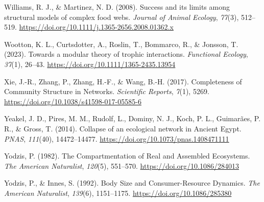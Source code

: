 \documentclass[
]{article}
\newlength{\cslhangindent}
\newenvironment{CSLReferences}[2] %
 {\begin{list}{}{%
  \setlength{\itemindent}{0pt}
  \setlength{\leftmargin}{0pt}
  \setlength{\parsep}{0pt}
  \ifodd #1
   \setlength{\leftmargin}{\cslhangindent}
   \setlength{\itemindent}{-1\cslhangindent}
  \fi
  \setlength{\itemsep}{#2\baselineskip}}}
 {\end{list}}
\begin{document}
\begin{CSLReferences}{1}{0}
Williams, R. J., \& Martinez, N. D. (2008). Success and its limits among
structural models of complex food webs. \emph{Journal of Animal
Ecology}, \emph{77}(3), 512--519.
\url{https://doi.org/10.1111/j.1365-2656.2008.01362.x}

Wootton, K. L., Curtsdotter, A., Roslin, T., Bommarco, R., \& Jonsson,
T. (2023). Towards a modular theory of trophic interactions.
\emph{Functional Ecology}, \emph{37}(1), 26--43.
\url{https://doi.org/10.1111/1365-2435.13954}

Xie, J.-R., Zhang, P., Zhang, H.-F., \& Wang, B.-H. (2017). Completeness
of {Community Structure} in {Networks}. \emph{Scientific Reports},
\emph{7}(1), 5269. \url{https://doi.org/10.1038/s41598-017-05585-6}

Yeakel, J. D., Pires, M. M., Rudolf, L., Dominy, N. J., Koch, P. L.,
Guimarães, P. R., \& Gross, T. (2014). Collapse of an ecological network
in {Ancient Egypt}. \emph{PNAS}, \emph{111}(40), 14472--14477.
\url{https://doi.org/10.1073/pnas.1408471111}

Yodzis, P. (1982). The {Compartmentation} of {Real} and {Assembled
Ecosystems}. \emph{The American Naturalist}, \emph{120}(5), 551--570.
\url{https://doi.org/10.1086/284013}

Yodzis, P., \& Innes, S. (1992). Body {Size} and {Consumer-Resource
Dynamics}. \emph{The American Naturalist}, \emph{139}(6), 1151--1175.
\url{https://doi.org/10.1086/285380}

\end{CSLReferences}
\end{document}
